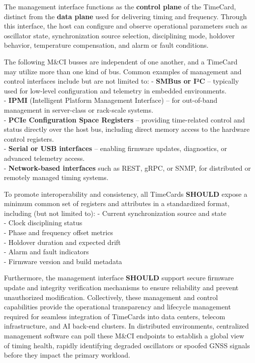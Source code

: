 \documentclass[
]{article}
\begin{document}
The management interface functions as the \textbf{control plane} of the
TimeCard, distinct from the \textbf{data plane} used for delivering
timing and frequency. Through this interface, the host can configure and
observe operational parameters such as oscillator state, synchronization
source selection, disciplining mode, holdover behavior, temperature
compensation, and alarm or fault conditions.

The following M\&CI busses are independent of one another, and a
TimeCard may utilize more than one kind of bus. Common examples of
management and control interfaces include but are not limited to: -
\textbf{SMBus or I²C} -- typically used for low-level configuration and
telemetry in embedded environments.\\
- \textbf{IPMI} (Intelligent Platform Management Interface) -- for
out-of-band management in server-class or rack-scale systems.\\
- \textbf{PCIe Configuration Space Registers} -- providing time-related
control and status directly over the host bus, including direct memory
access to the hardware control registers.\\
- \textbf{Serial or USB interfaces} -- enabling firmware updates,
diagnostics, or advanced telemetry access.\\
- \textbf{Network-based interfaces} such as REST, gRPC, or SNMP, for
distributed or remotely managed timing systems.

To promote interoperability and consistency, all TimeCards
\textbf{SHOULD} expose a minimum common set of registers and attributes
in a standardized format, including (but not limited to): - Current
synchronization source and state\\
- Clock disciplining status\\
- Phase and frequency offset metrics\\
- Holdover duration and expected drift\\
- Alarm and fault indicators\\
- Firmware version and build metadata

Furthermore, the management interface \textbf{SHOULD} support secure
firmware update and integrity verification mechanisms to ensure
reliability and prevent unauthorized modification. Collectively, these
management and control capabilities provide the operational transparency
and lifecycle management required for seamless integration of TimeCards
into data centers, telecom infrastructure, and AI back-end clusters. In
distributed environments, centralized management software can poll these
M\&CI endpoints to establish a global view of timing health, rapidly
identifying degraded oscillators or spoofed GNSS signals before they
impact the primary workload.
\end{document}
